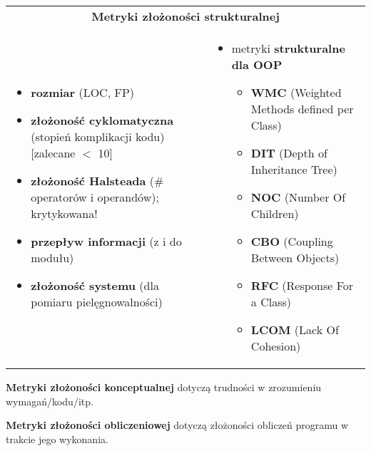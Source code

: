 \documentclass[../main.tex]{subfiles}
\begin{document}
    \begin{table}[H]
        \begin{center}
            \begin{tabular}{p{8cm} p{8cm}}
                \multicolumn{2}{c}{  \textbf{Metryki złożoności strukturalnej}}\\
                \begin{itemize}
                    \item \textbf{rozmiar} (LOC, FP)
                    \item \textbf{złożoność cyklomatyczna} (stopień komplikacji kodu) [zalecane $<$ 10]
                    \item \textbf{złożoność Halsteada} (\# operatorów i operandów); krytykowana!
                    \item \textbf{przepływ informacji} (z i do modułu)
                    \item \textbf{złożoność systemu} (dla pomiaru pielęgnowalności)
                \end{itemize}
                &
                \begin{itemize}
                    \item metryki \textbf{strukturalne dla OOP}
                    \begin{itemize}
                        \item \textbf{WMC} (Weighted Methods defined per Class)
                        \item \textbf{DIT} (Depth of Inheritance Tree)
                        \item \textbf{NOC} (Number Of Children)
                        \item \textbf{CBO} (Coupling Between Objects)
                        \item \textbf{RFC} (Response For a Class)
                        \item \textbf{LCOM} (Lack Of Cohesion)
                    \end{itemize}
                \end{itemize}\\
            \end{tabular}
        \end{center}
    \end{table}

    \textbf{Metryki złożoności konceptualnej} dotyczą trudności w zrozumieniu wymagań/kodu/itp.

    \textbf{Metryki złożoności obliczeniowej} dotyczą złożoności obliczeń programu w trakcie jego wykonania.
\end{document}
